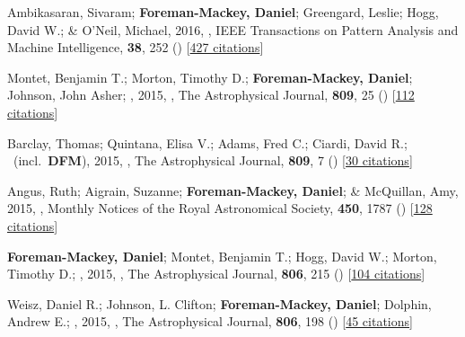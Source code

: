 \item[{\color{numcolor}\scriptsize14}] Ambikasaran, Sivaram; \textbf{Foreman-Mackey, Daniel}; Greengard, Leslie; Hogg, David W.; \& O'Neil, Michael, 2016, , IEEE Transactions on Pattern Analysis and Machine Intelligence, \textbf{38}, 252 () [\href{https://scholar.google.com/scholar?cites=4840899390891567426,9641158393712381489}{427 citations}]

\item[{\color{numcolor}\scriptsize13}] Montet, Benjamin T.; Morton, Timothy D.; \textbf{Foreman-Mackey, Daniel}; Johnson, John Asher; \etal, 2015, , The Astrophysical Journal, \textbf{809}, 25 () [\href{https://ui.adsabs.harvard.edu/abs/2015ApJ...809...25M}{112 citations}]

\item[{\color{numcolor}\scriptsize12}] Barclay, Thomas; Quintana, Elisa V.; Adams, Fred C.; Ciardi, David R.; \etal\ (incl.\ \textbf{DFM}), 2015, , The Astrophysical Journal, \textbf{809}, 7 () [\href{https://ui.adsabs.harvard.edu/abs/2015ApJ...809....7B}{30 citations}]

\item[{\color{numcolor}\scriptsize11}] Angus, Ruth; Aigrain, Suzanne; \textbf{Foreman-Mackey, Daniel}; \& McQuillan, Amy, 2015, , Monthly Notices of the Royal Astronomical Society, \textbf{450}, 1787 () [\href{https://ui.adsabs.harvard.edu/abs/2015MNRAS.450.1787A}{128 citations}]

\item[{\color{numcolor}\scriptsize10}] \textbf{Foreman-Mackey, Daniel}; Montet, Benjamin T.; Hogg, David W.; Morton, Timothy D.; \etal, 2015, , The Astrophysical Journal, \textbf{806}, 215 () [\href{https://ui.adsabs.harvard.edu/abs/2015ApJ...806..215F}{104 citations}]

\item[{\color{numcolor}\scriptsize9}] Weisz, Daniel R.; Johnson, L. Clifton; \textbf{Foreman-Mackey, Daniel}; Dolphin, Andrew E.; \etal, 2015, , The Astrophysical Journal, \textbf{806}, 198 () [\href{https://ui.adsabs.harvard.edu/abs/2015ApJ...806..198W}{45 citations}]

